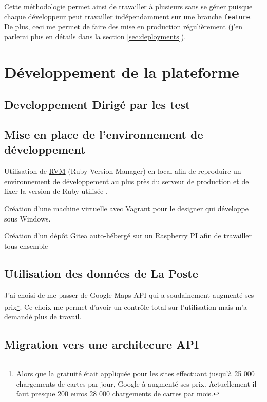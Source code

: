 \documentclass[]{report}
\begin{document}
    Cette méthodologie permet ainsi de travailler à plusieurs sans se géner puisque chaque développeur peut travailler indépendamment sur une branche \verb|feature|. De plus, ceci me permet de faire des mise en production régulièrement (j'en parlerai plus en détails dans la section \ref{sec:deployments}).

\chapter{Développement de la plateforme}

  \section{Developpement Dirigé par les test}


  \section{Mise en place de l'environnement de développement}

    Utilisation de \href{https://rvm.io}{RVM} (Ruby Version Manager) en local afin de reproduire un environnement de développement au plus près du serveur de production et de fixer la version de Ruby utilisée .

    Création d'une machine virtuelle avec \href{https://www.vagrantup.com}{Vagrant} pour le designer qui développe sous Windows.

    Création d'un dépôt Gitea auto-hébergé sur un Raspberry PI afin de travailler tous ensemble

  \section{Utilisation des données de La Poste}

    J'ai choisi  de me passer de Google Maps API qui a soudainement augmenté ses prix\footnote{Alors que la gratuité était appliquée pour les sites effectuant jusqu'à 25 000 chargements de cartes par jour, Google à augmenté ses prix. Actuellement il faut presque 200 euros 28 000 chargements de cartes par mois.}. Ce choix me permet d'avoir un contrôle total sur l'utilisation mais m'a demandé plus de travail.

  \section{Migration vers une architecure API}
\end{document}

